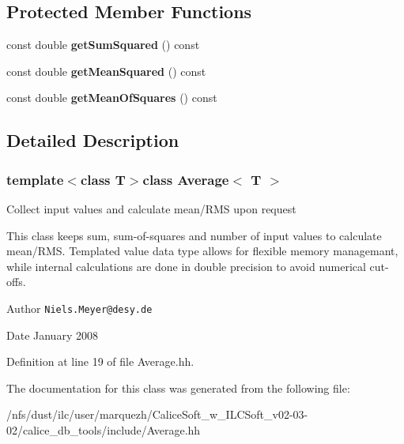 \subsection*{Protected Member Functions}
\begin{DoxyCompactItemize}
\item 
const double {\bfseries get\-Sum\-Squared} () const \label{classAverage_a4de86661fad1773ebbd9dfe21fe01e42}

\item 
const double {\bfseries get\-Mean\-Squared} () const \label{classAverage_aefc203610b1934156db3dbd4f0686410}

\item 
const double {\bfseries get\-Mean\-Of\-Squares} () const \label{classAverage_a2a846d87e98b5adfb14e2ce37008e076}

\end{DoxyCompactItemize}


\subsection{Detailed Description}
\subsubsection*{template$<$class T$>$class Average$<$ T $>$}

Collect input values and calculate mean/\-R\-M\-S upon request

This class keeps sum, sum-\/of-\/squares and number of input values to calculate mean/\-R\-M\-S. Templated value data type allows for flexible memory managemant, while internal calculations are done in double precision to avoid numerical cut-\/offs.

\begin{DoxyAuthor}{Author}
{\tt Niels.\-Meyer@desy.\-de} 
\end{DoxyAuthor}
\begin{DoxyDate}{Date}
January 2008 
\end{DoxyDate}


Definition at line 19 of file Average.\-hh.



The documentation for this class was generated from the following file\-:\begin{DoxyCompactItemize}
\item 
/nfs/dust/ilc/user/marquezh/\-Calice\-Soft\-\_\-w\-\_\-\-I\-L\-C\-Soft\-\_\-v02-\/03-\/02/calice\-\_\-db\-\_\-tools/include/Average.\-hh\end{DoxyCompactItemize}
